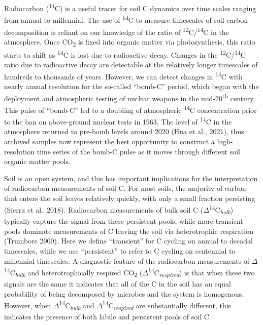 \documentclass[english,man,floatsintext]{apa6}
\begin{document}
Radiocarbon (\textsuperscript{14}C) is a useful tracer for soil C dynamics over time scales ranging from annual to millennial. The use of \textsuperscript{14}C to measure timescales of soil carbon decomposition is reliant on our knowledge of the ratio of \textsuperscript{12}C/\textsuperscript{14}C in the atmosphere. Once CO\textsubscript{2} is fixed into organic matter via photosynthesis, this ratio starts to shift as \textsuperscript{14}C is lost due to radioactive decay. Changes in the \textsuperscript{12}C/\textsuperscript{14}C ratio due to radioactive decay are detectable at the relatively longer timescales of hundreds to thousands of years. However, we can detect changes in \textsuperscript{14}C with nearly annual resolution for the so-called \enquote{bomb-C} period, which began with the deployment and atmospheric testing of nuclear weapons in the mid-20\textsuperscript{th} century. This pulse of \enquote{bomb-C} led to a doubling of atmospheric \textsuperscript{14}C concentration prior to the ban on above-ground nuclear tests in 1963. The level of \textsuperscript{14}C in the atmosphere returned to pre-bomb levels around 2020 (Hua et al., 2021), thus archived samples now represent the best opportunity to construct a high-resolution time series of the bomb-C pulse as it moves through different soil organic matter pools.

Soil is an open system, and this has important implications for the interpretation of radiocarbon measurements of soil C. For most soils, the majority of carbon that enters the soil leaves relatively quickly, with only a small fraction persisting (Sierra et al.~2018). Radiocarbon measurements of bulk soil C (\(\Delta\)\textsuperscript{14}C\textsubscript{\emph{bulk}}) typically capture the signal from these persistent pools, while more transient pools dominate measurements of C leaving the soil via heterotrophic respiration (Trumbore 2000). Here we define \enquote{transient} for C cycling on annual to decadal timescales, while we use \enquote{persistent} to refer to C cycling on centennial to millennial timescales. A diagnostic feature of the radiocarbon measurements of \(\Delta\)\textsuperscript{14}C\textsubscript{\emph{bulk}} and heterotrophically respired CO\textsubscript{2} (\(\Delta\)\textsuperscript{14}C\textsubscript{\emph{respired}}) is that when these two signals are the same it indicates that all of the C in the soil has an equal probability of being decomposed by microbes and the system is homogenous. However, when \(\Delta\)\textsuperscript{14}C\textsubscript{\emph{bulk}} and \(\Delta\)\textsuperscript{14}C\textsubscript{\emph{respired}} are substantially different, this indicates the presence of both labile and persistent pools of soil C.
\end{document}
